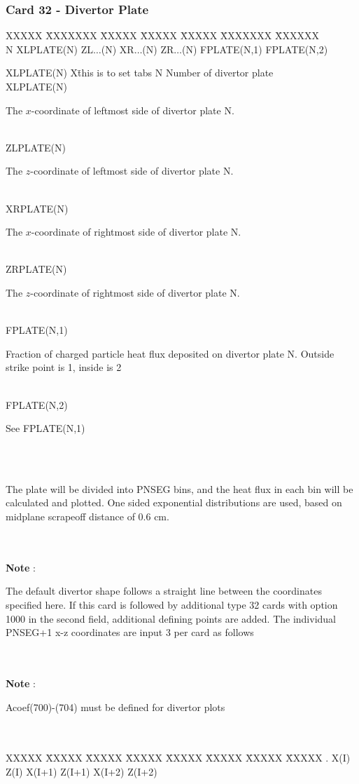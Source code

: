 \newpage \subsubsection{Card 32 - Divertor Plate}
\begin{tabbing}
XXXXX \= XXXXXXX \= XXXXX \= XXXXX \= XXXXX \= XXXXXXX \=  XXXXXX       \\
\footnotesize N \>\footnotesize XLPLATE(N) \>\footnotesize ZL$\ldots$(N) \>\footnotesize
XR$\ldots$(N) \>\footnotesize ZR$\ldots$(N) \>\footnotesize FPLATE(N,1) \>\footnotesize FPLATE(N,2)
\end{tabbing}
\begin{tabbing}
XLPLATE(N) X\= this is to set tabs \kill
N \> Number of divertor plate\\
XLPLATE(N) \> \parbox[t]{\width}{The $x$-coordinate of leftmost side of divertor plate N.}\\
ZLPLATE(N) \> \parbox[t]{\width}{The $z$-coordinate of leftmost side of divertor plate N.}\\
XRPLATE(N) \> \parbox[t]{\width}{The $x$-coordinate of rightmost side of divertor plate N.}\\
ZRPLATE(N) \> \parbox[t]{\width}{The $z$-coordinate of rightmost side of divertor plate N.}\\
FPLATE(N,1) \> \parbox[t]{\width}{Fraction of charged particle heat flux deposited on divertor
plate N. Outside strike point is 1, inside is 2}\\
FPLATE(N,2) \> \parbox[t]{\width}{See FPLATE(N,1)}\\
 \\
\parbox[t]{\textwidth}{The plate will be divided into PNSEG bins, and the heat flux in each bin
will be calculated and plotted. One sided exponential distributions are used, based on midplane
scrapeoff distance of 0.6 cm.}\\
\\
{\bf Note} : \> \parbox[t]{\width}{The default divertor shape follows a straight line between the coordinates 
specified here.  If this card is followed by additional type 32 cards with option 1000 in the second field,
additional defining points are added.  The individual PNSEG+1 x-z coordinates are input 3 per
card as follows}\\
\\
{\bf Note} : \> \parbox[t]{\width}{Acoef(700)-(704) must be defined for divertor plots}\\
\\
XXXXX \= XXXXX \= XXXXX \= XXXXX \= XXXXX \= XXXXX \= XXXXX \= XXXXX
 . \> X(I) \> Z(I) \> X(I+1) \> Z(I+1) \> X(I+2) \> Z(I+2)
\end{tabbing}
\pagebreak
